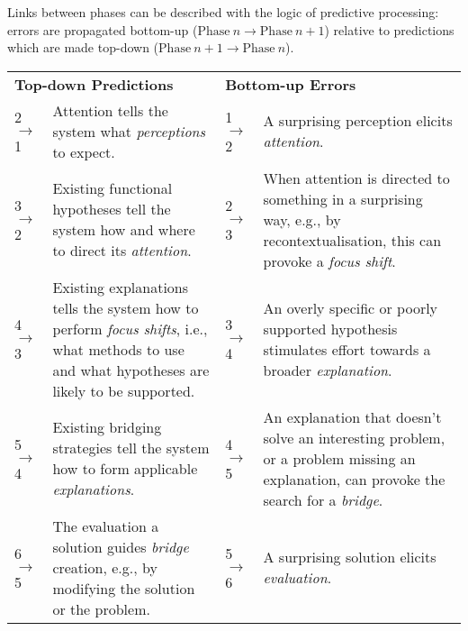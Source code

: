 
\noindent Links between phases can be described with the logic of
predictive processing: errors are propagated bottom-up
($\mathrm{Phase}\ n\rightarrow\mathrm{Phase}\ n+1$) relative to predictions which are made top-down
($\mathrm{Phase}\ n+1\rightarrow\mathrm{Phase}\ n$).


\medskip
\noindent
\begin{tabular}{lp{}lp{}}
\multicolumn{2}{l}{\textbf{Top-down Predictions}}   & \multicolumn{2}{l}{\textbf{Bottom-up Errors}}\\[.1cm]
 2$\rightarrow$1 & Attention tells the system what \emph{perceptions} to expect.
 &1$\rightarrow$2 & A surprising perception elicits \emph{attention}.\\
 3$\rightarrow$2 & Existing functional hypotheses tell the system how and where to direct its \emph{attention}.
 &2$\rightarrow$3 & When attention is directed to something in a surprising way, e.g., by recontextualisation, this can provoke a \emph{focus shift}.\\
 4$\rightarrow$3 & Existing explanations tells the system how to perform \emph{focus shifts}, i.e., what methods to use and what hypotheses are likely to be supported.
 &3$\rightarrow$4 & An overly specific or poorly supported hypothesis stimulates effort towards a broader \emph{explanation}. \\
 5$\rightarrow$4 & Existing bridging strategies tell the system how to form applicable \emph{explanations}.
 & 4$\rightarrow$5 & An explanation that doesn't solve an interesting problem, or a problem missing an explanation, can provoke the search for a \emph{bridge}.\\
 6$\rightarrow$5 & The evaluation a solution guides \emph{bridge} creation, e.g., by modifying the solution or the problem.
 &5$\rightarrow$6 & A surprising solution elicits \emph{evaluation}.\\
\end{tabular}
\medskip

